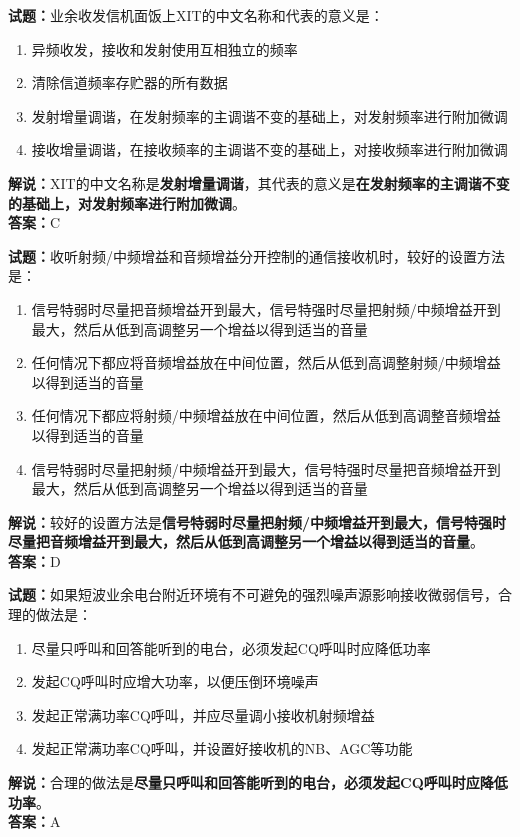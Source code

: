 \documentclass{ctexbook}
\begin{document}
\bigskip


\noindent\textbf{试题：}业余收发信机面饭上XIT的中文名称和代表的意义是：
\begin{enumerate}[leftmargin=3em]
\item 异频收发，接收和发射使用互相独立的频率
\item 清除信道频率存贮器的所有数据
\item 发射增量调谐，在发射频率的主调谐不变的基础上，对发射频率进行附加微调
\item 接收增量调谐，在接收频率的主调谐不变的基础上，对接收频率进行附加微调
\end{enumerate}
\noindent\textbf{解说：}XIT的中文名称是\textbf{发射增量调谐}，其代表的意义是\textbf{在发射频率的主调谐不变的基础上，对发射频率进行附加微调}。\\\noindent\textbf{答案：}C




\bigskip


\noindent\textbf{试题：}收听射频/中频增益和音频增益分开控制的通信接收机时，较好的设置方法是：
\begin{enumerate}[leftmargin=3em]
\item 信号特弱时尽量把音频增益开到最大，信号特强时尽量把射频/中频增益开到最大，然后从低到高调整另一个增益以得到适当的音量
\item 任何情况下都应将音频增益放在中间位置，然后从低到高调整射频/中频增益以得到适当的音量
\item 任何情况下都应将射频/中频增益放在中间位置，然后从低到高调整音频增益以得到适当的音量
\item 信号特弱时尽量把射频/中频增益开到最大，信号特强时尽量把音频增益开到最大，然后从低到高调整另一个增益以得到适当的音量
\end{enumerate}
\noindent\textbf{解说：}较好的设置方法是\textbf{信号特弱时尽量把射频/中频增益开到最大，信号特强时尽量把音频增益开到最大，然后从低到高调整另一个增益以得到适当的音量}。\\\noindent\textbf{答案：}D



\bigskip


\noindent\textbf{试题：}如果短波业余电台附近环境有不可避免的强烈噪声源影响接收微弱信号，合理的做法是：
\begin{enumerate}[leftmargin=3em]
\item 尽量只呼叫和回答能听到的电台，必须发起CQ呼叫时应降低功率
\item 发起CQ呼叫时应增大功率，以便压倒环境噪声
\item 发起正常满功率CQ呼叫，并应尽量调小接收机射频增益
\item 发起正常满功率CQ呼叫，并设置好接收机的NB、AGC等功能
\end{enumerate}
\noindent\textbf{解说：}合理的做法是\textbf{尽量只呼叫和回答能听到的电台，必须发起CQ呼叫时应降低功率}。\\\noindent\textbf{答案：}A
\end{document}
